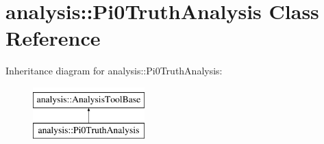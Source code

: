 \hypertarget{classanalysis_1_1Pi0TruthAnalysis}{}\section{analysis\+:\+:Pi0\+Truth\+Analysis Class Reference}
\label{classanalysis_1_1Pi0TruthAnalysis}
Inheritance diagram for analysis\+:\+:Pi0\+Truth\+Analysis\+:\begin{figure}[H]
\begin{center}
\leavevmode
\includegraphics[height=2.000000cm]{classanalysis_1_1Pi0TruthAnalysis}
\end{center}
\end{figure}
